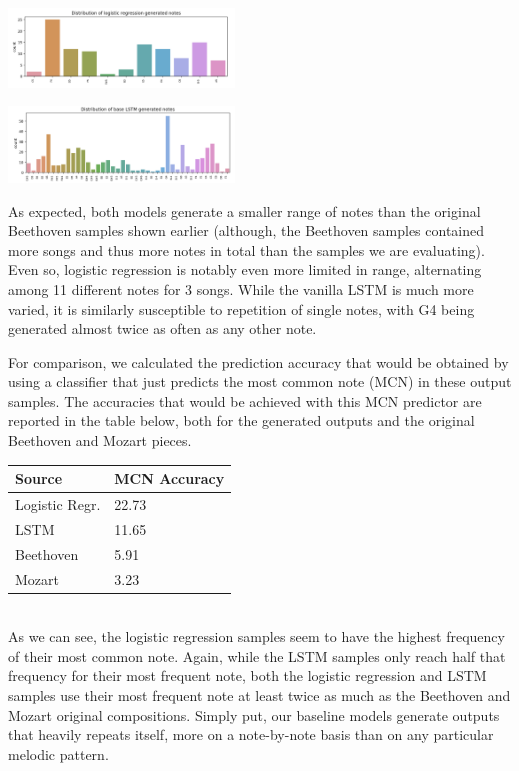 \documentclass[twoside,twocolumn]{article}
\begin{document}
\includegraphics[width = 0.45\textwidth]{images/logreg_notes.png}

\includegraphics[width = 0.45\textwidth]{images/simple_lstm_notes.png}

As expected, both models generate a smaller range of notes than the original Beethoven samples shown earlier (although, the Beethoven samples contained more songs and thus more notes in total than the samples we are evaluating). Even so, logistic regression is notably even more limited in range, alternating among 11 different notes for 3 songs. While the vanilla LSTM is much more varied, it is similarly susceptible to repetition of single notes, with G4 being generated almost twice as often as any other note.

For comparison, we calculated the prediction accuracy that would be obtained by using a classifier that just predicts the most common note (MCN) in these output samples. The accuracies that would be achieved with this MCN predictor are reported in the table below, both for the generated outputs and the original Beethoven and Mozart pieces. \\

\begin{tabular}{|l|l|}
\hline
\textbf{Source} & \textbf{MCN Accuracy} \\ \hline
Logistic Regr.  & 22.73                 \\ \hline
LSTM            & 11.65                 \\ \hline
Beethoven       & 5.91                  \\ \hline
Mozart          & 3.23                  \\ \hline
\end{tabular} \\

As we can see, the logistic regression samples seem to have the highest frequency of their most common note. Again, while the LSTM samples only reach half that frequency for their most frequent note, both the logistic regression and LSTM samples use their most frequent note at least twice as much as the Beethoven and Mozart original compositions. Simply put, our baseline models generate outputs that heavily repeats itself, more on a note-by-note basis than on any particular melodic pattern.
\end{document}
